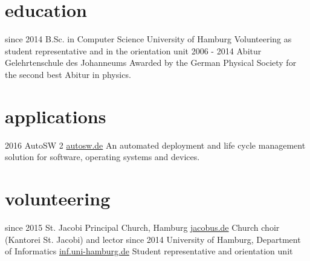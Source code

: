 \documentclass[]{friggeri-cv}
\begin{document}
\section{education}

\begin{entrylist}
  \entry
    {since 2014}
    {B.Sc. {\normalfont in Computer Science}}
    {University of Hamburg}
    {Volunteering as student representative and in the orientation unit}
  \entry
    {2006 - 2014}
    {Abitur}
    {Gelehrtenschule des Johanneums}
    {Awarded by the German Physical Society for the second best Abitur in physics.}
\end{entrylist}

\section{applications}

\begin{entrylist}
 \entry
    {2016}
    {AutoSW 2}
    {\href{https://www.autosw.de/Demo/Benefit}{autosw.de}}
    {An automated deployment and life cycle management solution for software, operating systems and devices.}
\end{entrylist}

\section{volunteering}

  \begin{entrylist}
    \entry
      {since 2015}
      {St. Jacobi Principal Church, Hamburg}
      {\href{http://www.jacobus.de}{jacobus.de}}
      {Church choir (Kantorei St. Jacobi) and lector}
    \entry
      {since 2014}
      {University of Hamburg, Department of Informatics}
      {\href{https://www.inf.uni-hamburg.de/en.html}{inf.uni-hamburg.de}}
      {Student representative and orientation unit}
  \end{entrylist}
%

%
\end{document}
